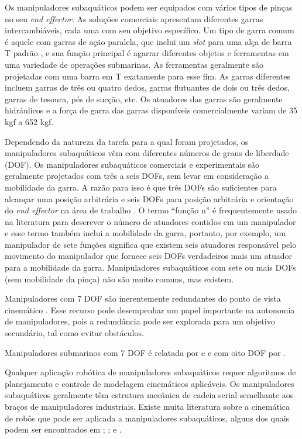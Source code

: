 
Os manipuladores subaquáticos podem ser equipados com vários tipos de pinças no seu \textit{end effector}. As soluções comerciais apresentam diferentes garras intercambiáveis, cada uma com seu objetivo específico. Um tipo de garra comum é aquele com garras de ação paralela, que inclui um \textit{slot} para uma alça de barra T padrão \cite{iso2010petroleum}, e sua função principal é agarrar diferentes objetos e ferramentas em uma variedade de operações submarinas. As ferramentas geralmente são projetadas com uma barra em T exatamente para esse fim. As garras diferentes incluem garras de três ou quatro dedos, garras flutuantes de dois ou três dedos, garras de tesoura, pés de sucção, etc. Os atuadores das garras são geralmente hidráulicos e a força de garra das garras disponíveis comercialmente variam de 35 kgf a 652 kgf.

Dependendo da natureza da tarefa para a qual foram projetados, os manipuladores subaquáticos vêm com diferentes números de graus de liberdade (DOF). Os manipuladores subaquáticos comerciais e experimentais são geralmente projetados com três a seis DOFs, sem levar em consideração a mobilidade da garra. A razão para isso é que três DOFs são suficientes para alcançar uma posição arbitrária e seis DOFs para posição arbitrária e orientação do \textit{end effector} na área de trabalho \cite{spong2005robot}. 
O termo “função n” é frequentemente usado na literatura para descrever o número de atuadores contidos em um manipulador e esse termo também inclui a mobilidade da garra, portanto, por exemplo, um manipulador de sete funções significa que existem seis atuadores responsável pelo movimento do manipulador que fornece seis DOFs verdadeiros mais um atuador para a mobilidade da garra. Manipuladores subaquáticos com sete ou mais DOFs (sem mobilidade da pinça) não são muito comuns, mas existem. 

Manipuladores com 7 DOF são inerentemente redundantes do ponto de vista cinemático \cite{siciliano2010robotics}. Esse recurso pode desempenhar um papel importante na autonomia de manipuladores, pois a redundância pode ser explorada para um objetivo secundário, tal como evitar obstáculos. 

Manipuladores submarinos com 7 DOF é relatada por  e  e com oito DOF por . 

Qualquer aplicação robótica de manipuladores subaquáticos requer algoritmos de planejamento e controle de modelagem cinemáticos aplicáveis. Os manipuladores subaquáticos geralmente têm estrutura mecânica de cadeia serial semelhante aos braços de manipuladores industriais. Existe muita literatura sobre a cinemática de robôs que pode ser aplicada a manipuladores subaquáticos, alguns dos quais podem ser encontrados em ; ; e . 

